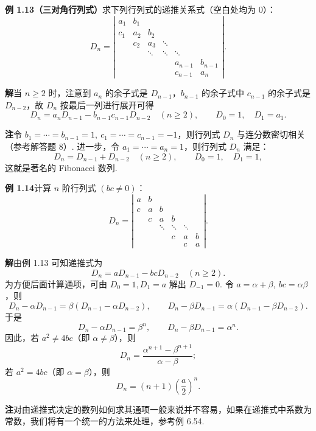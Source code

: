 \documentclass[UTF8, 12pt, fontset=fandol, oneside]{ctexart}
\begin{document}
\noindent\textbf{例 1.13（三对角行列式）}\quad 求下列行列式的递推关系式（空白处均为 $0$）：
\[
D_n=\left|\begin{array}{cccccc}
a_1 & b_1 &        &        &        & \\
c_1 & a_2 & b_2    &        &        & \\
    & c_2 & a_3    & \ddots &        & \\
    &     & \ddots & \ddots & \ddots & \\
    &     &        &        & a_{n-1} & b_{n-1}\\
    &     &        &        & c_{n-1} & a_n
\end{array}\right|.
\]

\noindent\textbf{解}\quad 当 $n\ge2$ 时，注意到 $a_n$ 的余子式是 $D_{n-1}$，$b_{n-1}$ 的余子式中 $c_{n-1}$ 的余子式是 $D_{n-2}$，故 $D_n$ 按最后一列进行展开可得
\[
D_n=a_nD_{n-1}-b_{n-1}c_{n-1}D_{n-2}\quad(n\ge2),\qquad
D_0=1,\quad D_1=a_1.
\]

\noindent\textbf{注}\quad 令 $b_1=\cdots=b_{n-1}=1,\ c_1=\cdots=c_{n-1}=-1$，则行列式 $D_n$ 与连分数密切相关（参考解答题 8）. 进一步，令 $a_1=\cdots=a_n=1$，则行列式 $D_n$ 满足：
\[
D_n=D_{n-1}+D_{n-2}\quad(n\ge2),\qquad D_0=1,\quad D_1=1,
\]
这就是著名的 Fibonacci 数列.

\noindent\textbf{例 1.14}\quad 计算 $n$ 阶行列式 $(bc\ne0)$：
\[
D_n=\left|\begin{array}{cccccc}
a & b &        &        &        & \\
c & a & b      &        &        & \\
  & c & a      & b      &        & \\
  &   & \ddots & \ddots & \ddots & \\
  &   &        & c      & a      & b\\
  &   &        &        & c      & a
\end{array}\right|.
\]

\noindent\textbf{解}\quad 由例 1.13 可知递推式为
\[
D_n=aD_{n-1}-bcD_{n-2}\quad(n\ge2).
\]
为方便后面计算通项，可由 $D_0=1,D_1=a$ 解出 $D_{-1}=0$. 令 $a=\alpha+\beta,\ bc=\alpha\beta$，则
\[
D_n-\alpha D_{n-1}=\beta(D_{n-1}-\alpha D_{n-2}),\qquad
D_n-\beta D_{n-1}=\alpha(D_{n-1}-\beta D_{n-2}).
\]
于是
\[
D_n-\alpha D_{n-1}=\beta^n,\qquad
D_n-\beta D_{n-1}=\alpha^n.
\]
因此，若 $a^2\ne4bc$（即 $\alpha\ne\beta$），则
\[
D_n=\frac{\alpha^{n+1}-\beta^{n+1}}{\alpha-\beta};
\]
若 $a^2=4bc$（即 $\alpha=\beta$），则
\[
D_n=(n+1)\left(\frac a2\right)^n.
\]

\noindent\textbf{注}\quad 对由递推式决定的数列如何求其通项一般来说并不容易，如果在递推式中系数为常数，我们将有一个统一的方法来处理，参考例 6.54.
\end{document}
